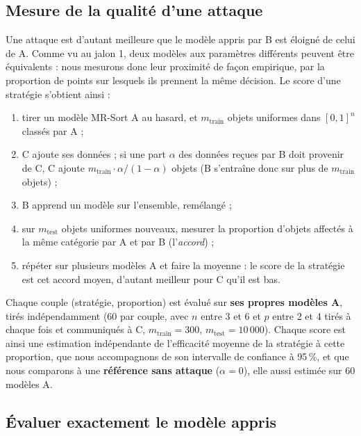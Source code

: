 \documentclass[11pt,a4paper]{article}
\begin{document}
\subsection{Mesure de la qualité d'une attaque}

Une attaque est d'autant meilleure que le modèle appris par B est éloigné de celui de A. Comme vu au jalon 1,
deux modèles aux paramètres différents peuvent être équivalents : nous mesurons donc leur proximité de façon
empirique, par la proportion de points sur lesquels ils prennent la même décision. Le score d'une stratégie
s'obtient ainsi :
\begin{enumerate}
  \item tirer un modèle MR-Sort A au hasard, et $m_{\text{train}}$ objets uniformes dans $[0,1]^n$ classés par A ;
  \item C ajoute ses données ; si une part $\alpha$ des données reçues par B doit provenir de C, C ajoute
        $m_{\text{train}} \cdot \alpha / (1-\alpha)$ objets (B s'entraîne donc sur plus de $m_{\text{train}}$ objets) ;
  \item B apprend un modèle sur l'ensemble, remélangé ;
  \item sur $m_{\text{test}}$ objets uniformes nouveaux, mesurer la proportion d'objets affectés à la même
        catégorie par A et par B (l'\emph{accord}) ;
  \item répéter sur plusieurs modèles A et faire la moyenne : le score de la stratégie est cet accord moyen,
        d'autant meilleur pour C qu'il est bas.
\end{enumerate}
Chaque couple (stratégie, proportion) est évalué sur \textbf{ses propres modèles A}, tirés indépendamment
(60 par couple, avec $n$ entre 3 et 6 et $p$ entre 2 et 4 tirés à chaque fois et communiqués à C,
$m_{\text{train}} = 300$, $m_{\text{test}} = 10\,000$). Chaque score est ainsi une estimation indépendante de
l'efficacité moyenne de la stratégie à cette proportion, que nous accompagnons de son intervalle de confiance à
95\,\%, et que nous comparons à une \textbf{référence sans attaque} ($\alpha = 0$), elle aussi estimée sur 60
modèles A.

\subsection{Évaluer exactement le modèle appris}
\end{document}
